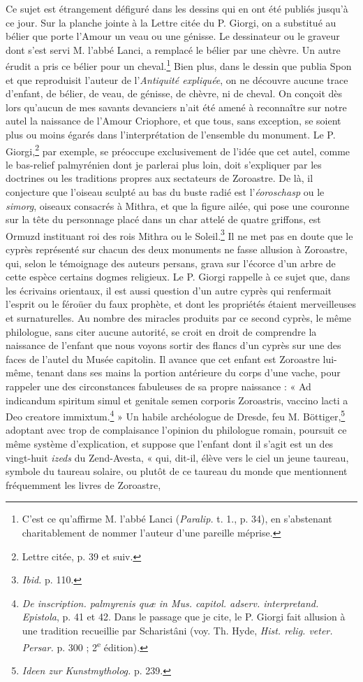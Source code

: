 \documentclass{article}
\begin{document}
Ce sujet est étrangement défiguré dans les dessins qui en ont été publiés jusqu'à ce jour. Sur la planche jointe à la Lettre citée du P. Giorgi, on a substitué au bélier que porte l'Amour un veau ou une génisse. Le dessinateur ou le graveur dont s'est servi M. l'abbé Lanci, a remplacé le bélier par une chèvre. Un autre érudit a pris ce bélier pour un cheval.\footnote{C'est ce qu'affirme M. l'abbé Lanci (\emph{Paralip.} t. 1., p. 34), en s'abstenant charitablement de nommer l'auteur d'une pareille méprise.} Bien plus, dans le dessin que publia Spon et que reproduisit l'auteur de l'\emph{Antiquité expliquée}, on ne découvre aucune trace d'enfant, de bélier, de veau, de génisse, de chèvre, ni de cheval. On conçoit dès lors qu'aucun de mes savants devanciers n'ait été amené à reconnaître sur notre autel la naissance de l'Amour Criophore, et que tous, sans exception, se soient plus ou moins égarés dans l'interprétation de l'ensemble du monument. Le P. Giorgi,\footnote{Lettre citée, p. 39 et suiv.} par exemple, se préoccupe exclusivement de l'idée que cet autel, comme le bas-relief palmyrénien dont je parlerai plus loin, doit s'expliquer par les doctrines ou les traditions propres aux sectateurs de Zoroastre. De là, il conjecture que l'oiseau sculpté au bas du buste radié est l'\emph{éoroschasp} ou le \emph{simorg}, oiseaux consacrés à Mithra, et que la figure ailée, qui pose une couronne sur la tête du personnage placé dans un char attelé de quatre griffons, est Ormuzd instituant roi des rois Mithra ou le Soleil.\footnote{\emph{Ibid.} p. 110.} Il ne met pas en doute que le cyprès représenté sur chacun des deux monuments ne fasse allusion à Zoroastre, qui, selon le témoignage des auteurs persans, grava sur l'écorce d'un arbre de cette espèce certains dogmes religieux. Le P. Giorgi rappelle à ce sujet que, dans les écrivains orientaux, il est aussi question d'un autre cyprès qui renfermait l'esprit ou le féroüer du faux prophète, et dont les propriétés étaient merveilleuses et surnaturelles. Au nombre des miracles produits par ce second cyprès, le même philologue, sans citer aucune autorité, se croit en droit de comprendre la naissance de l'enfant que nous voyons sortir des flancs d'un cyprès sur une des faces de l'autel du Musée capitolin. Il avance que cet enfant est Zoroastre lui-même, tenant dans ses mains la portion antérieure du corps d'une vache, pour rappeler une des circonstances fabuleuses de sa propre naissance : « Ad indicandum spiritum simul et genitale semen corporis Zoroastris, vaccino lacti a Deo creatore immixtum.\footnote{\emph{De inscription. palmyrenis quæ in Mus. capitol. adserv. interpretand. Epistola}, p. 41 et 42. Dans le passage que je cite, le P. Giorgi fait allusion à une tradition recueillie par Scharistâni (voy. Th. Hyde, \emph{Hist. relig. veter. Persar.} p. 300 ; 2\textsuperscript{e} édition).} » Un habile archéologue de Dresde, feu M. Böttiger,\footnote{\emph{Ideen zur Kunstmytholog.} p. 239.} adoptant avec trop de complaisance l'opinion du philologue romain, poursuit ce même système d'explication, et suppose que l'enfant dont il s'agit est un des vingt-huit \emph{izeds} du Zend-Avesta, « qui, dit-il, élève vers le ciel un jeune taureau, symbole du taureau solaire, ou plutôt de ce taureau du monde que mentionnent fréquemment les livres de Zoroastre, 
\end{document}
